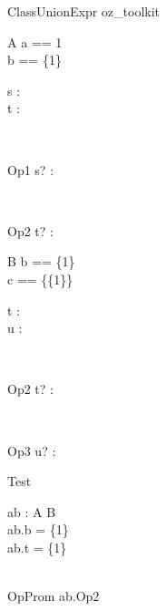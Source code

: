 \begin{zsection}
  \SECTION ClassUnionExpr \parents oz\_toolkit
\end{zsection}

\begin{class}{A}
  a == 1\\
  b == \{1\}\\
  \begin{state}
    s : \nat\\
    t : \power \nat
  \end{state}\\
  \begin{op}{Op1}
    s? : \nat
  \end{op}\\
  \begin{op}{Op2}
    t? : \power \nat
  \end{op}
\end{class}

\begin{class}{B}
  b == \{1\}\\
  c == \{\{1\}\}\\
  \begin{state}
    t : \power \nat\\
    u : \power \power \nat
  \end{state}\\
  \begin{op}{Op2}
    t? : \power \nat
  \end{op}\\
  \begin{op}{Op3}
    u? : \power \power \nat
  \end{op}
\end{class}

\begin{class}{Test}
  \begin{state}
    ab : A \classuni B\\
  \where
    ab.b = \{1\}\\
    ab.t = \{1\}
  \end{state}\\
  OpProm \sdef ab.Op2
\end{class}
